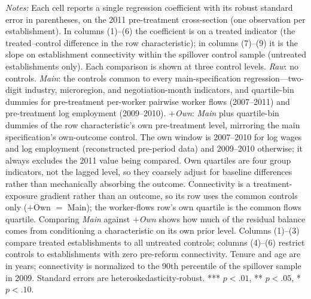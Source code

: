 \begin{table}[H]
\begin{threeparttable}
\begin{tablenotes}
\item \textit{Notes:} Each cell reports a single regression coefficient with its robust standard error in parentheses, on the 2011 pre-treatment cross-section (one observation per establishment). In columns (1)--(6) the coefficient is on a treated indicator (the treated--control difference in the row characteristic); in columns (7)--(9) it is the slope on establishment connectivity within the spillover control sample (untreated establishments only). Each comparison is shown at three control levels. \textit{Raw}: no controls. \textit{Main}: the controls common to every main-specification regression---two-digit industry, microregion, and negotiation-month indicators, and quartile-bin dummies for pre-treatment per-worker pairwise worker flows (2007--2011) and pre-treatment log employment (2009--2010). \textit{$+$Own}: \textit{Main} plus quartile-bin dummies of the row characteristic's own pre-treatment level, mirroring the main specification's own-outcome control. The own window is 2007--2010 for log wages and log employment (reconstructed pre-period data) and 2009--2010 otherwise; it always excludes the 2011 value being compared. Own quartiles are four group indicators, not the lagged level, so they coarsely adjust for baseline differences rather than mechanically absorbing the outcome. Connectivity is a treatment-exposure gradient rather than an outcome, so its row uses the common controls only ($+$Own $=$ Main); the worker-flows row's own quartile is the common flows quartile. Comparing \textit{Main} against \textit{$+$Own} shows how much of the residual balance comes from conditioning a characteristic on its own prior level. Columns (1)--(3) compare treated establishments to all untreated controls; columns (4)--(6) restrict controls to establishments with zero pre-reform connectivity. Tenure and age are in years; connectivity is normalized to the 90th percentile of the spillover sample in 2009. Standard errors are heteroskedasticity-robust. *** $p<.01$, ** $p<.05$, * $p<.10$.
\end{tablenotes}
\end{threeparttable}
\end{table}
